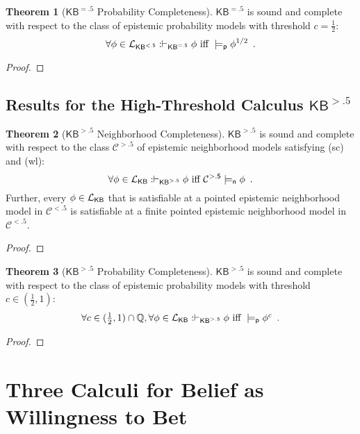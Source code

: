 \documentclass[12pt]{article}
\newcommand{\XXXcomment}[1]{}
\newcommand{\XXXcomment}[1]{\marginpar{\color{blue}{\footnotesize #1}}}
\theoremstyle{definition}
\newtheorem{theorem}{Theorem}[section]
\newcommand{\Rat}{\mathbb{Q}}  %
\newcommand{\Lang}{{\cal L}}   %
\newcommand{\KB}{{\mathsf{KB}}}                     %
\newcommand{\KBlt}{{\mathsf{KB}^{\mathsf{<.5}}}}    %
\newcommand{\KBeq}{{\mathsf{KB}^{\mathsf{=.5}}}}    %
\newcommand{\KBgt}{{\mathsf{KB}^{\mathsf{>.5}}}}    %
\newcommand{\Clt}{{\mathcal{C}^{\mathsf{<.5}}}}    %
\newcommand{\Cgt}{{\mathcal{C}^{\mathsf{>.5}}}}    %
\newcommand{\modelsn}{\models_{\mathsf{n}}}                  %
\newcommand{\modelsp}{\models_{\mathsf{p}}}                  %
\begin{document}
\XXXcomment{Not sure about $\KBeq$ probability completeness. --br}

\begin{theorem}[$\KBeq$ Probability Completeness]
  $\KBeq$ is sound and complete with respect to the class of epistemic
  probability models with threshold $c=\frac 12$:
  \[
  \forall\phi\in\Lang_\KBlt: \vdash_\KBeq\phi \text{ iff }
  {}\modelsp\phi^{1/2} \enspace.
  \]
\end{theorem}
\begin{proof}
\end{proof}

\subsection{Results for the High-Threshold Calculus $\KBgt$}

\begin{theorem}[$\KBgt$ Neighborhood Completeness]
  $\KBgt$ is sound and complete with respect to the class $\Cgt$ of
  epistemic neighborhood models satisfying (sc) and (wl):
  \[
  \forall\phi\in\Lang_\KB: \vdash_\KBgt\phi \text{ iff }
  \Cgt\modelsn\phi \enspace.
  \]
  Further, every $\phi\in\Lang_\KB$ that is satisfiable at a pointed
  epistemic neighborhood model in $\Clt$ is satisfiable at a finite
  pointed epistemic neighborhood model in $\Clt$.
\end{theorem}
\begin{proof}
\end{proof}

\XXXcomment{Not sure about $\KBgt$ probability completeness.\hfill--br}

\begin{theorem}[$\KBgt$ Probability Completeness]
  $\KBgt$ is sound and complete with respect to the class of epistemic
  probability models with threshold $c\in(\frac 12,1)$:
  \[
  \textstyle \forall c\in(\frac 12,1)
  \cap\Rat,\forall\phi\in\Lang_\KB: \vdash_\KBgt\phi \text{ iff }
  {}\modelsp\phi^c \enspace.
  \]
\end{theorem}
\begin{proof}
\end{proof}

\section{Three Calculi for Belief as Willingness to Bet} 
\label{Section:TreeCalculi}

\XXXcomment{Old version of this section (written by Jan). Note that
  this section still tacitly assumes that $c=\frac 12$. \hfill{}--br}
\end{document}
